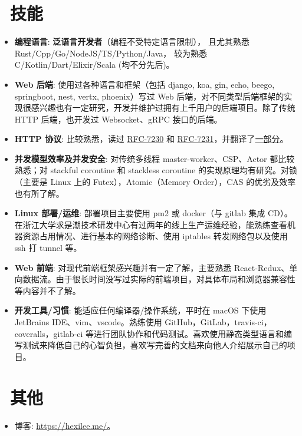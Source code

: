 \documentclass{resume}
\begin{document}
\section{\texorpdfstring{\faCogs}{}\ 技能}
\begin{itemize}[parsep=0.25ex]
  \item \textbf{编程语言}:
    \textbf{泛语言开发者}（编程不受特定语言限制），
    且尤其熟悉 Rust/Cpp/Go/NodeJS/TS/Python/Java，
    较为熟悉 C/Kotlin/Dart/Elixir/Scala (均不分先后)。

  \item \textbf{Web 后端}:
    使用过各种语言和框架（包括 django, koa, gin, echo, beego, springboot, nest, vertx, phoenix）写过 Web 后端，对不同类型后端框架的实现很感兴趣也有一定研究，开发并维护过拥有上千用户的后端项目。除了传统 HTTP 后端，也开发过 Websocket、gRPC 接口的后端。

  \item \textbf{HTTP 协议}:
    比较熟悉，读过 \href{https://tools.ietf.org/html/rfc7230} {RFC-7230} 和 \href{https://tools.ietf.org/html/rfc7231} {RFC-7231}，并翻译了\href{https://github.com/Hexilee/RFC-HTTP_1.1-zh} {一部分}。

  \item \textbf{并发模型效率及并发安全}:  
    对传统多线程 master-worker、CSP、Actor 都比较熟悉；对 stackful coroutine 和 stackless coroutine 的实现原理均有研究。对锁（主要是 Linux 上的 Futex），Atomic（Memory Order），CAS 的优劣及效率也有所了解。

  \item \textbf{Linux 部署/运维}:
    部署项目主要使用 pm2 或 docker（与 gitlab 集成 CD）。在浙江大学求是潮技术研发中心有过两年的线上生产运维经验，能熟练查看机器资源占用情况、进行基本的网络诊断、使用 iptables 转发网络包以及使用 ssh 打 tunnel 等。
  
  \item \textbf{Web 前端}:
    对现代前端框架感兴趣并有一定了解，主要熟悉 React-Redux、单向数据流。由于很长时间没写过实际的前端项目，对具体布局和浏览器兼容性等内容并不了解。

  \item \textbf{开发工具/习惯}:
    能适应任何编译器/操作系统，平时在 macOS 下使用 JetBrains IDE、vim、vscode。熟练使用 GitHub，GitLab，travis-ci，coveralls，gitlab-ci 等进行团队协作和代码测试。喜欢使用静态类型语言和编写测试来降低自己的心智负担，喜欢写完善的文档来向他人介绍展示自己的项目。
\end{itemize}

\section{\texorpdfstring{\faInfo}{}\ 其他}
\begin{itemize}[parsep=0.25ex]
  \item 博客: \url{https://hexilee.me/}。
\end{itemize}
\end{document}
